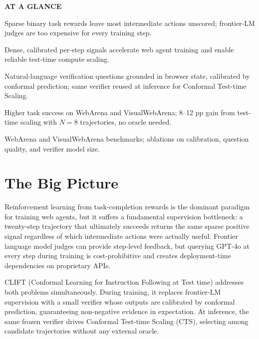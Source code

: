 \documentclass[10pt,twocolumn]{article}
\begin{document}
\begin{mdframed}[backgroundcolor=boxgray,linecolor=rulered,linewidth=1pt,
    innerleftmargin=6pt,innerrightmargin=6pt,
    innertopmargin=6pt,innerbottommargin=6pt]
\textbf{\small AT A GLANCE}\par\vspace{4pt}
\begin{description}[leftmargin=0pt,labelsep=4pt,itemsep=2pt,parsep=0pt,
    font=\small\bfseries]
  \item[Problem:] Sparse binary task rewards leave most intermediate actions
    unscored; frontier-LM judges are too expensive for every training step.
  \item[Why it matters:] Dense, calibrated per-step signals accelerate web
    agent training and enable reliable test-time compute scaling.
  \item[Method:] Natural-language verification questions grounded in browser
    state, calibrated by conformal prediction; same verifier reused at
    inference for Conformal Test-time Scaling.
  \item[Result:] Higher task success on WebArena and VisualWebArena; 8--12 pp
    gain from test-time scaling with $N{=}8$ trajectories, no oracle needed.
  \item[Evidence:] WebArena and VisualWebArena benchmarks; ablations on
    calibration, question quality, and verifier model size.
\end{description}
\end{mdframed}

\section{The Big Picture}

Reinforcement learning from task-completion rewards is the dominant paradigm
for training web agents, but it suffers a fundamental supervision bottleneck:
a twenty-step trajectory that ultimately succeeds returns the same sparse
positive signal regardless of which intermediate actions were actually useful.
Frontier language model judges can provide step-level feedback, but querying
GPT-4o at every step during training is cost-prohibitive and creates
deployment-time dependencies on proprietary APIs.

CLIFT (Conformal Learning for Instruction Following at Test time) addresses
both problems simultaneously. During training, it replaces frontier-LM
supervision with a small verifier whose outputs are calibrated by conformal
prediction, guaranteeing non-negative evidence in expectation. At inference,
the same frozen verifier drives Conformal Test-time Scaling (CTS), selecting
among candidate trajectories without any external oracle.
\end{document}
